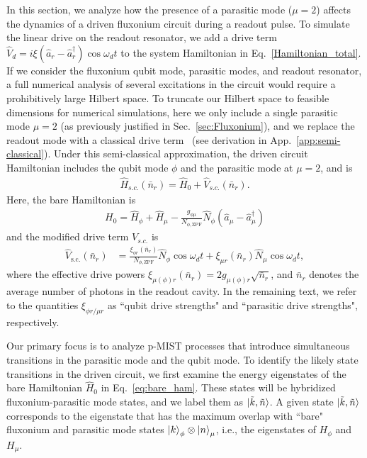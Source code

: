 \documentclass[%
reprint,
superscriptaddress,
 amsmath,amssymb,
 aps,
 prx,
longbibliography,
floatfix,
]{revtex4-2}
\begin{document}
In this section, we analyze how the presence of a parasitic mode ($\mu=2$) affects the dynamics of a driven fluxonium circuit during a readout pulse. To simulate the linear drive on the readout resonator, we add a drive term $\hat{V}_d=i\xi (\hat a_r-\hat a_r^\dagger)\cos{\omega_d t}$ to the system Hamiltonian in Eq.~\ref{Hamiltonian_total}. If we consider the fluxonium qubit mode, parasitic modes, and readout resonator, a full numerical analysis of several excitations in the circuit would require a prohibitively large Hilbert space. To truncate our Hilbert space to feasible dimensions for numerical simulations, here we only include a single parasitic mode $\mu=2$ (as previously justified in Sec.~\ref{sec:Fluxonium}), and we replace the readout mode with a classical drive term~\cite{cohen2023reminiscence,dumas2024unified,xiao2023diagrammatic} (see derivation in App.~\ref{app:semi-classical}). Under this semi-classical approximation, the driven circuit Hamiltonian includes the qubit mode $\phi$ and the parasitic mode at $\mu=2$, and is
\begin{align}
  \hat H_{s.c.}(\bar n_r)=\hat H_0+\hat V_{s.c.}(\bar n_r).  \label{eq:drive_Ham}
\end{align}
Here, the bare Hamiltonian is
\begin{align}
H_0=\hat H_\phi+\hat H_{\mu}-\frac{g_{\phi\mu}}{N_{\phi,\mathrm{ZPF}}} \hat N_\phi (\hat a_{\mu}-\hat a_{\mu}^\dagger) \label{eq:bare_ham} 
\end{align}
and the modified drive term $V_{s.c.}$ is
\begin{align}
    \hat V_\textrm{s.c.}(\bar n_r)&=\frac{\xi_{\phi r}(\bar n_r)}{N_{\phi,\mathrm{ZPF}}} \hat N_\phi\cos{\omega_d t}+\xi_{\mu r}(\bar n_r) \hat N_\mu\cos{\omega_d t}\label{eq:drive},
\end{align}
where the effective drive powers $\xi_{\mu(\phi) r}(\bar n_r)=2g_{\mu(\phi) r}\sqrt{\bar n_r}$, and $\bar n_r$ denotes the average number of photons in the readout cavity. In the remaining text, we refer to the quantities $\xi_{\phi r/\mu r}$ as  ``qubit drive strengths" and ``parasitic drive strengths", respectively. 

Our primary focus is to analyze p-MIST processes that introduce simultaneous transitions in the parasitic mode and the qubit mode. To identify the likely state transitions in the driven circuit, we first examine the energy eigenstates of the bare Hamiltonian $\hat{H}_0$ in Eq.~\ref{eq:bare_ham}. These states will be hybridized fluxonium-parasitic mode states, and we label them as $\ket{\tilde{k}, \tilde{n}}$.  A given state $\ket{\tilde{k}, \tilde{n}}$ corresponds to the eigenstate that has the maximum overlap with ``bare" fluxonium and parasitic mode states $\ket{k}_\phi\otimes\ket{n}_\mu$, i.e., the eigenstates of $H_{\phi}$ and $H_{\mu}$.
\end{document}

